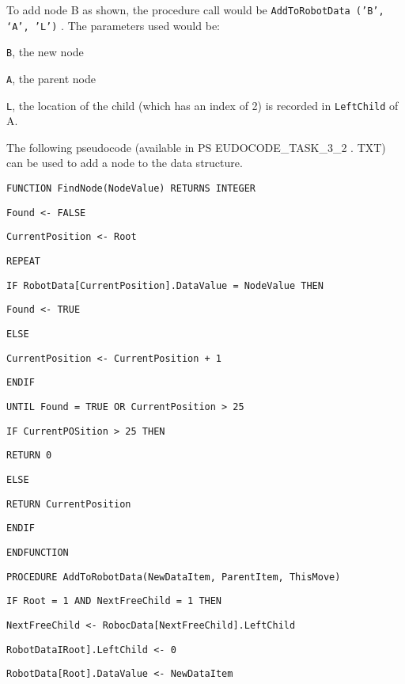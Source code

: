 To add node B as shown, the procedure call would be \texttt{AddToRobotData
('B', \textquoteleft A', 'L')} . The parameters used would be: 

\texttt{B}, the new node 

\texttt{A}, the parent node 

\texttt{L}, the location of the child (which has an index of 2) is
recorded in \texttt{LeftChild} of A.

The following pseudocode (available in PS EUDOCODE\_TASK\_3\_2 . TXT)
can be used to add a node to the data structure.

\noindent %
\noindent\begin{minipage}[t]{1\columnwidth}%
\texttt{FUNCTION FindNode(NodeValue) RETURNS INTEGER }

\texttt{\qquad{}Found <- FALSE}

\texttt{\qquad{}CurrentPosition <- Root }

\texttt{\qquad{}REPEAT }

\texttt{\qquad{}\qquad{}IF RobotData{[}CurrentPosition{]}.DataValue
= NodeValue THEN }

\texttt{\qquad{}\qquad{}\qquad{}Found <- TRUE }

\texttt{\qquad{}\qquad{}ELSE }

\texttt{\qquad{}\qquad{}\qquad{}CurrentPosition <- CurrentPosition
+ 1 }

\texttt{\qquad{}\qquad{}ENDIF }

\texttt{\qquad{}UNTIL Found = TRUE OR CurrentPosition > 25 }

\texttt{\qquad{}IF CurrentPOSition > 25 THEN }

\texttt{\qquad{}\qquad{}RETURN 0}

\texttt{\qquad{}ELSE }

\texttt{\qquad{}\qquad{}RETURN CurrentPosition }

\texttt{\qquad{}ENDIF }

\texttt{ENDFUNCTION}

\bigskip{}

\texttt{PROCEDURE AddToRobotData(NewDataItem, ParentItem, ThisMove) }

\texttt{\qquad{}\qquad{}IF Root = 1 AND NextFreeChild = 1 THEN }

\texttt{\qquad{}\qquad{}\qquad{}NextFreeChild <- RobocData{[}NextFreeChild{]}.LeftChild }

\texttt{\qquad{}\qquad{}\qquad{}RobotDataIRoot{]}.LeftChild <-
0 }

\texttt{\qquad{}\qquad{}\qquad{}RobotData{[}Root{]}.DataValue <-
NewDataItem }


\end{minipage}
